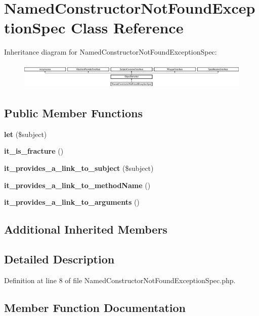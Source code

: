 \section{Named\+Constructor\+Not\+Found\+Exception\+Spec Class Reference}
\label{classspec_1_1_php_spec_1_1_exception_1_1_fracture_1_1_named_constructor_not_found_exception_spec}
Inheritance diagram for Named\+Constructor\+Not\+Found\+Exception\+Spec\+:\begin{figure}[H]
\begin{center}
\leavevmode
\includegraphics[height=1.272727cm]{classspec_1_1_php_spec_1_1_exception_1_1_fracture_1_1_named_constructor_not_found_exception_spec}
\end{center}
\end{figure}
\subsection*{Public Member Functions}
\begin{DoxyCompactItemize}
\item 
{\bf let} (\$subject)
\item 
{\bf it\+\_\+is\+\_\+fracture} ()
\item 
{\bf it\+\_\+provides\+\_\+a\+\_\+link\+\_\+to\+\_\+subject} (\$subject)
\item 
{\bf it\+\_\+provides\+\_\+a\+\_\+link\+\_\+to\+\_\+method\+Name} ()
\item 
{\bf it\+\_\+provides\+\_\+a\+\_\+link\+\_\+to\+\_\+arguments} ()
\end{DoxyCompactItemize}
\subsection*{Additional Inherited Members}


\subsection{Detailed Description}


Definition at line 8 of file Named\+Constructor\+Not\+Found\+Exception\+Spec.\+php.



\subsection{Member Function Documentation}
